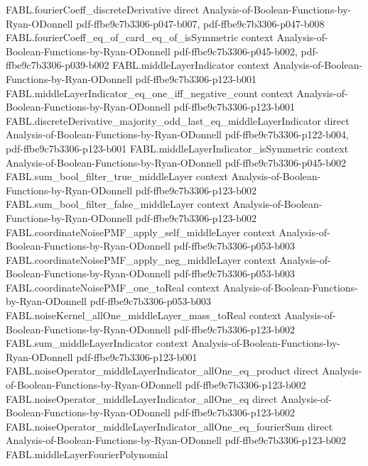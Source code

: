 \begin{theorem}
\proofstep
  {FABL.fourierCoeff_discreteDerivative}
  {direct}
  {Analysis-of-Boolean-Functions-by-Ryan-ODonnell}
  {pdf-ffbe9c7b3306-p047-b007,
    pdf-ffbe9c7b3306-p047-b008}
\proofstep
  {FABL.fourierCoeff_eq_of_card_eq_of_isSymmetric}
  {context}
  {Analysis-of-Boolean-Functions-by-Ryan-ODonnell}
  {pdf-ffbe9c7b3306-p045-b002,
    pdf-ffbe9c7b3306-p039-b002}
\proofstep
  {FABL.middleLayerIndicator}
  {context}
  {Analysis-of-Boolean-Functions-by-Ryan-ODonnell}
  {pdf-ffbe9c7b3306-p123-b001}
\proofstep
  {FABL.middleLayerIndicator_eq_one_iff_negative_count}
  {context}
  {Analysis-of-Boolean-Functions-by-Ryan-ODonnell}
  {pdf-ffbe9c7b3306-p123-b001}
\proofstep
  {FABL.discreteDerivative_majority_odd_last_eq_middleLayerIndicator}
  {direct}
  {Analysis-of-Boolean-Functions-by-Ryan-ODonnell}
  {pdf-ffbe9c7b3306-p122-b004,
    pdf-ffbe9c7b3306-p123-b001}
\proofstep
  {FABL.middleLayerIndicator_isSymmetric}
  {context}
  {Analysis-of-Boolean-Functions-by-Ryan-ODonnell}
  {pdf-ffbe9c7b3306-p045-b002}
\proofstep
  {FABL.sum_bool_filter_true_middleLayer}
  {context}
  {Analysis-of-Boolean-Functions-by-Ryan-ODonnell}
  {pdf-ffbe9c7b3306-p123-b002}
\proofstep
  {FABL.sum_bool_filter_false_middleLayer}
  {context}
  {Analysis-of-Boolean-Functions-by-Ryan-ODonnell}
  {pdf-ffbe9c7b3306-p123-b002}
\proofstep
  {FABL.coordinateNoisePMF_apply_self_middleLayer}
  {context}
  {Analysis-of-Boolean-Functions-by-Ryan-ODonnell}
  {pdf-ffbe9c7b3306-p053-b003}
\proofstep
  {FABL.coordinateNoisePMF_apply_neg_middleLayer}
  {context}
  {Analysis-of-Boolean-Functions-by-Ryan-ODonnell}
  {pdf-ffbe9c7b3306-p053-b003}
\proofstep
  {FABL.coordinateNoisePMF_one_toReal}
  {context}
  {Analysis-of-Boolean-Functions-by-Ryan-ODonnell}
  {pdf-ffbe9c7b3306-p053-b003}
\proofstep
  {FABL.noiseKernel_allOne_middleLayer_mass_toReal}
  {context}
  {Analysis-of-Boolean-Functions-by-Ryan-ODonnell}
  {pdf-ffbe9c7b3306-p123-b002}
\proofstep
  {FABL.sum_middleLayerIndicator}
  {context}
  {Analysis-of-Boolean-Functions-by-Ryan-ODonnell}
  {pdf-ffbe9c7b3306-p123-b001}
\proofstep
  {FABL.noiseOperator_middleLayerIndicator_allOne_eq_product}
  {direct}
  {Analysis-of-Boolean-Functions-by-Ryan-ODonnell}
  {pdf-ffbe9c7b3306-p123-b002}
\proofstep
  {FABL.noiseOperator_middleLayerIndicator_allOne_eq}
  {direct}
  {Analysis-of-Boolean-Functions-by-Ryan-ODonnell}
  {pdf-ffbe9c7b3306-p123-b002}
\proofstep
  {FABL.noiseOperator_middleLayerIndicator_allOne_eq_fourierSum}
  {direct}
  {Analysis-of-Boolean-Functions-by-Ryan-ODonnell}
  {pdf-ffbe9c7b3306-p123-b002}
\proofstep
  {FABL.middleLayerFourierPolynomial}

\end{theorem}
